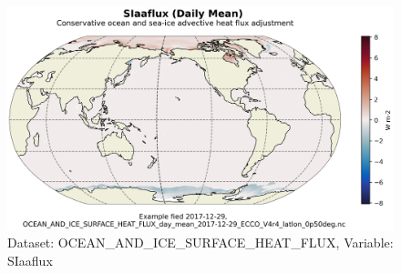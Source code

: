\begin{figure}[H]
\centering
\includegraphics[scale=0.55]{../images/plots/latlon_plots/Ocean_and_Sea-Ice_Surface_Heat_Fluxes/SIaaflux.png}
\caption{Dataset: OCEAN\_AND\_ICE\_SURFACE\_HEAT\_FLUX, Variable: SIaaflux}
\label{tab:table-OCEAN_AND_ICE_SURFACE_HEAT_FLUX_SIaaflux-Plot}
\end{figure}
\pagebreak

